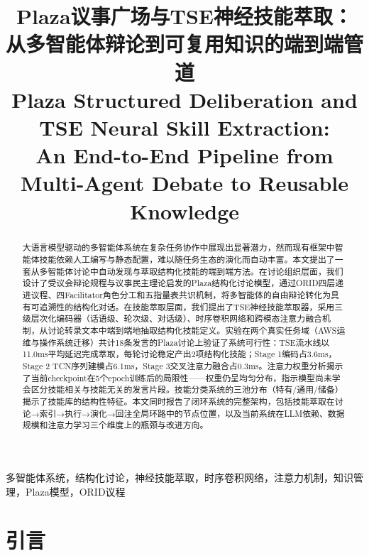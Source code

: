 \documentclass[conference]{IEEEtran}
\begin{document}

\title{Plaza议事广场与TSE神经技能萃取：\\从多智能体辩论到可复用知识的端到端管道\\
\large{Plaza Structured Deliberation and TSE Neural Skill Extraction:\\
An End-to-End Pipeline from Multi-Agent Debate to Reusable Knowledge}}

\author{}
\maketitle

\begin{abstract}
大语言模型驱动的多智能体系统在复杂任务协作中展现出显著潜力，然而现有框架中智能体技能依赖人工编写与静态配置，难以随任务生态的演化而自动丰富。本文提出了一套从多智能体讨论中自动发现与萃取结构化技能的端到端方法。在讨论组织层面，我们设计了受议会辩论规程与议事民主理论启发的Plaza结构化讨论模型，通过ORID四层递进议程、四Facilitator角色分工和五指量表共识机制，将多智能体的自由辩论转化为具有可追溯性的结构化对话。在技能萃取层面，我们提出了TSE神经技能萃取器，采用三级层次化编码器（话语级、轮次级、对话级）、时序卷积网络和跨模态注意力融合机制，从讨论转录文本中端到端地抽取结构化技能定义。实验在两个真实任务域（AWS运维与操作系统迁移）共计18条发言的Plaza讨论上验证了系统可行性：TSE流水线以11.0ms平均延迟完成萃取，每轮讨论稳定产出2项结构化技能；Stage 1编码占3.6ms，Stage 2 TCN序列建模占6.1ms，Stage 3交叉注意力融合占0.3ms。注意力权重分析揭示了当前checkpoint在5个epoch训练后的局限性——权重仍呈均匀分布，指示模型尚未学会区分技能相关与技能无关的发言片段。技能分类系统的三池分布（特有/通用/储备）揭示了技能库的结构性特征。本文同时报告了闭环系统的完整架构，包括技能萃取在讨论→索引→执行→演化→回注全局环路中的节点位置，以及当前系统在LLM依赖、数据规模和注意力学习三个维度上的瓶颈与改进方向。
\end{abstract}

\begin{IEEEkeywords}
多智能体系统，结构化讨论，神经技能萃取，时序卷积网络，注意力机制，知识管理，Plaza模型，ORID议程
\end{IEEEkeywords}

\section{引言}
\end{document}
